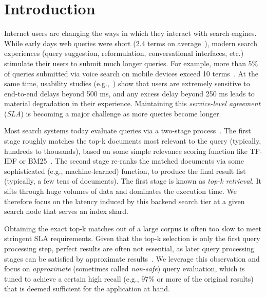 \section{Introduction}
\label{sec:intro}

Internet users are changing the ways in which they interact with search engines. 
While  early days web queries were short (2.4 terms on average~\cite{Spink:2001:SWP:362968.362979}), 
modern search experiences (query suggestion, reformulation, conversational interfaces, etc.) stimulate their users to submit much longer queries. 
For example, more than 5\% of queries submitted via voice search on mobile devices exceed 10 terms~\cite{sigir/Guy16}. 
At the same time, usability studies
(e.g.,~\cite{Arapakis:2014:IRL:2600428.2609627}) show that users are extremely sensitive to end-to-end delays beyond 500 ms, 
and any excess delay beyond 250 ms leads to material degradation in their experience. Maintaining this \emph{service-level agreement} ({\em SLA}) 
is becoming a major challenge as more queries become longer.

 Most search systems today evaluate queries via a two-stage process~\cite{Wang:2011}. 
The first stage roughly matches the top-k documents most relevant to the query (typically, hundreds to thousands), based on some simple relevance scoring function like TF-IDF or BM25~\cite{Baeza-Yates:1999:MIR:553876}. The second stage re-ranks the matched documents via some sophisticated (e.g., machine-learned) function, to produce the final result list (typically, a few tens of documents). 
The first stage is known as {\em top-k retrieval}. It sifts through huge volumes of data and dominates the execution time. 
We therefore focus on the latency induced by this backend search tier at a given search node that serves an index shard.

Obtaining the exact top-k matches out of a large corpus is often too slow to meet stringent SLA requirements. 
Given that the top-k selection is only the first query  processing step, perfect results are often not essential, as later query processing 
stages can be satisfied by approximate results~\cite{Lin:2015}. We leverage this observation and focus on \emph{approximate} 
(sometimes called \emph{non-safe}) query evaluation, which is tuned to achieve a certain high recall (e.g., $97\%$ or more 
of the original results) that is deemed sufficient for the application at hand. 

